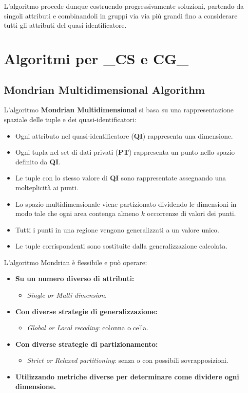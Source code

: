 \documentclass{report}
\begin{document}
\noindent L'algoritmo procede dunque costruendo progressivamente soluzioni, partendo da singoli attributi e combinandoli in gruppi via via più grandi fino a considerare tutti gli attributi del quasi-identificatore.

\newpage
\section{Algoritmi per \_CS e CG\_}

\subsection{Mondrian Multidimensional Algorithm}
L'algoritmo \textbf{Mondrian Multidimensional} si basa su una rappresentazione spaziale delle tuple e dei quasi-identificatori:

\begin{itemize}
    \item Ogni attributo nel quasi-identificatore (\textbf{QI}) rappresenta una dimensione.
    \item Ogni tupla nel set di dati privati (\textbf{PT}) rappresenta un punto nello spazio definito da \textbf{QI}.
    \item Le tuple con lo stesso valore di \textbf{QI} sono rappresentate assegnando una molteplicità ai punti.
    \item Lo spazio multidimensionale viene partizionato dividendo le dimensioni in modo tale che ogni area contenga almeno $k$ occorrenze di valori dei punti. 
    \item Tutti i punti in una regione vengono generalizzati a un valore unico.
    \item Le tuple corrispondenti sono sostituite dalla generalizzazione calcolata.
\end{itemize}

\noindent L'algoritmo Mondrian è flessibile e può operare:
\begin{itemize}
    \item \textbf{Su un numero diverso di attributi:} 
    \begin{itemize}
        \item \textit{Single or Multi-dimension}.
    \end{itemize}
    \item \textbf{Con diverse strategie di generalizzazione:}
    \begin{itemize}
        \item \textit{Global or Local recoding}: colonna o cella.
    \end{itemize}
    \item \textbf{Con diverse strategie di partizionamento:} 
    \begin{itemize}
        \item \textit{Strict or Relaxed partitioning}: senza o con possibili sovrapposizioni.
    \end{itemize}
    \item \textbf{Utilizzando metriche diverse per determinare come dividere ogni dimensione.}
\end{itemize}
\end{document}
